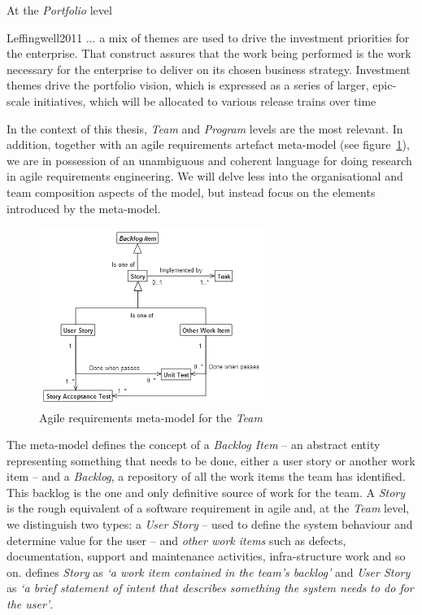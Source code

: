 \documentclass[dissertation,final]{softeng}
\begin{document}
At the \emph{Portfolio} level
\begin{displaycquote}{Leffingwell2011}
... a mix of themes are used to drive the investment priorities for the enterprise. That construct assures that the work being performed is the work necessary for the enterprise to deliver on its chosen business strategy. Investment themes drive the portfolio vision, which is expressed as a series of larger, epic-scale initiatives, which will be allocated to various release trains over time
\end{displaycquote}

In the context of this thesis, \emph{Team} and \emph{Program} levels are the most relevant. In addition, together with an agile requirements artefact meta-model (see figure~\ref{fig:metamodel_partial}), we are in possession of an unambiguous and coherent language for doing research in agile requirements engineering. We will delve less into the organisational and team composition aspects of the model, but instead focus on the elements introduced by the meta-model.

\begin{figure}[h]
\includegraphics[width=0.65\textwidth]{metamodel_partial2}
\centering
\caption{Agile requirements meta-model for the \emph{Team}}
\label{fig:metamodel_partial}
\end{figure}

The meta-model defines the concept of a \emph{Backlog Item} -- an abstract entity representing something that needs to be done, either a user story or another work item -- and a \emph{Backlog}, a repository of all the work items the team has identified. This backlog is the one and only definitive source of work for the team. A \emph{Story} is the rough equivalent of a software requirement in agile and, at the \emph{Team} level, we distinguish two types: a \emph{User Story} -- used to define the system behaviour and determine value for the user -- and \emph{other work items} such as defects, documentation, support and maintenance activities, infra-structure work and so on. \citet{Leffingwell2011} defines \emph{Story} as \emph{`a work item contained in the team's backlog'} and \emph{User Story} as \emph{`a brief statement of intent that describes something the system needs to do for the user'}.
\end{document}
